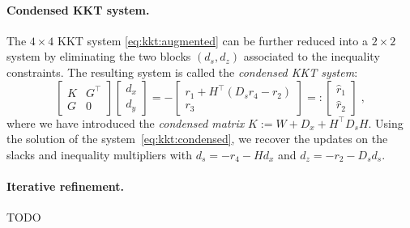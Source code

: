\paragraph{Condensed KKT system.}
The $4 \times 4$ KKT system \eqref{eq:kkt:augmented} can be further
reduced into a $2 \times 2$ system by eliminating the two blocks
$(d_s, d_z)$ associated to the inequality constraints.
The resulting system is called the \emph{condensed KKT system}:
\begin{equation}
  \label{eq:kkt:condensed}
  \tag{$K_1$}
  \begin{bmatrix}
    K & G^\top \\
    G & 0
  \end{bmatrix}
  \begin{bmatrix}
    d_x \\ d_y
  \end{bmatrix}
  =
  -
  \begin{bmatrix}
    r_1 + H^\top(D_s r_4 - r_2) \\ r_3
  \end{bmatrix}
  =:
  \begin{bmatrix}
    \hat{r}_1 \\ \hat{r}_2
  \end{bmatrix}
   \; ,
\end{equation}
where we have introduced the \emph{condensed matrix} $K := W + D_x + H^\top D_s H$.
Using the solution of the system~\eqref{eq:kkt:condensed},
we recover the updates on the slacks and inequality multipliers with
$d_s = -r_4 - Hd_x$ and $d_z = -r_2 - D_s d_s$.

\paragraph{Iterative refinement.} TODO

